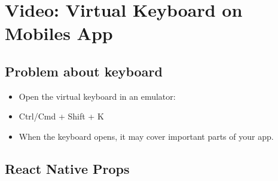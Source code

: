 \section{Video: Virtual Keyboard on Mobiles App}
\subsection{Problem about keyboard}
\begin{itemize}
    \item Open the virtual keyboard in an emulator:
    \item Ctrl/Cmd + Shift + K
    \item When the keyboard opens, it may cover important parts of your app. 
\end{itemize}

\subsection{React Native Props}
